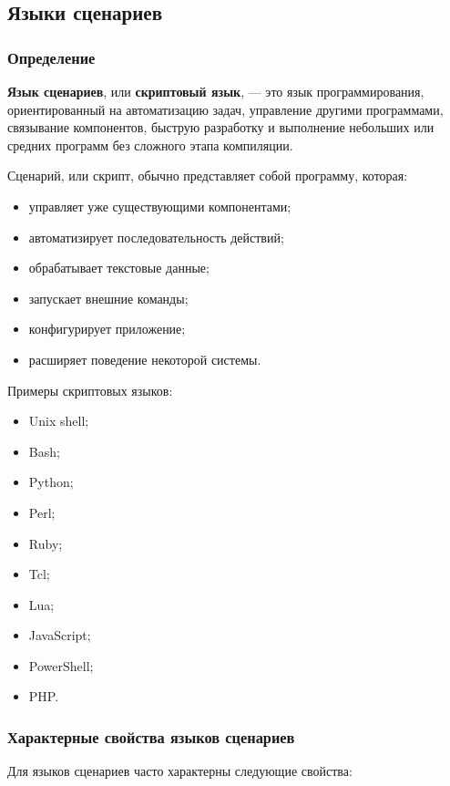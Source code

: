 \documentclass[12pt,a4paper]{article}
\begin{document}
\subsection{Языки сценариев}

\subsubsection{Определение}

\textbf{Язык сценариев}, или \textbf{скриптовый язык}, --- это язык программирования,
ориентированный на автоматизацию задач, управление другими программами, связывание
компонентов, быструю разработку и выполнение небольших или средних программ без
сложного этапа компиляции.

Сценарий, или скрипт, обычно представляет собой программу, которая:

\begin{itemize}
    \item управляет уже существующими компонентами;
    \item автоматизирует последовательность действий;
    \item обрабатывает текстовые данные;
    \item запускает внешние команды;
    \item конфигурирует приложение;
    \item расширяет поведение некоторой системы.
\end{itemize}

Примеры скриптовых языков:

\begin{itemize}
    \item Unix shell;
    \item Bash;
    \item Python;
    \item Perl;
    \item Ruby;
    \item Tcl;
    \item Lua;
    \item JavaScript;
    \item PowerShell;
    \item PHP.
\end{itemize}

\subsubsection{Характерные свойства языков сценариев}

Для языков сценариев часто характерны следующие свойства:
\end{document}
